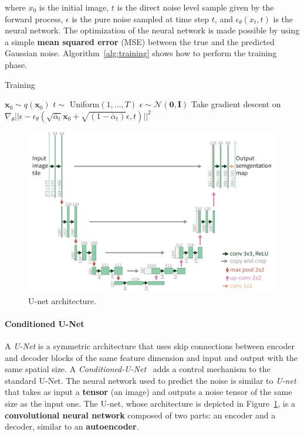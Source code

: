 \documentclass[preprint]{elsarticle}
\begin{document}
where $x_0$ is the initial image, $t$ is the direct noise level sample given by the
forward process, $\epsilon$ is the pure noise sampled at time step $t$, and 
$\epsilon_\theta(x_t,t)$ is the neural network. The optimization of the neural network is made possible 
by using a simple \textbf{mean squared error} (MSE) between the true and the predicted Gaussian noise. Algorithm~\ref{alg:training} shows how to perform the training phase.

\begin{algorithm}[t]
    \caption{Training}\label{alg:training}
    \begin{algorithmic}[1]
    \Repeat
        \State $\mathbf{x}_0 \sim q(\mathbf{x}_0)$
        \State $t \sim$ Uniform$({1,\ldots,T})$
        \State $\epsilon \sim \mathcal{N}(\mathbf{0},\mathbf{I})$ 
        \State Take gradient descent on 
        $\nabla_\theta||\epsilon - \epsilon_\theta
	(\sqrt{\bar{\alpha}_t}\mathbf{x}_0 + \sqrt{(1-\bar{\alpha}_t)}\epsilon,t) ||^2$
    \end{algorithmic}
\end{algorithm}




\begin{figure}[t]
	\centering
    \includegraphics[scale=0.87]{img/svg/UNET.png}
	\caption{U-net architecture.}\label{fig:unet}
\end{figure}



\paragraph{Conditioned U-Net} A \emph{U-Net} is a symmetric architecture that uses skip connections between encoder and decoder blocks of the same feature dimension and input and output with the same spatial size. A \emph{Conditioned-U-Net}~\cite{conditionedunet} adds a control mechanism to the standard U-Net.
The neural network used to predict the noise is similar to \emph{U-net}~\cite{ronneberger2015unet} that takes as input a  \textbf{tensor} (an image) and outputs a noise tensor of the same size as the input one. The U-net, whose architecture is depicted in Figure~\ref{fig:unet}, is a \textbf{convolutional neural network}  composed of two parts: an encoder and a decoder, similar to an \textbf{autoencoder}.
\end{document}
